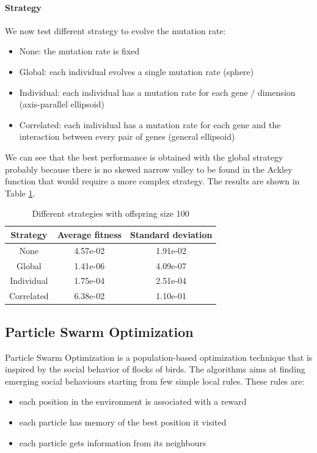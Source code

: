 \paragraph*{Strategy}
We now test different strategy to evolve the mutation rate:
\begin{itemize}
    \item None: the mutation rate is fixed
    \item Global: each individual evolves a single mutation rate (sphere)
    \item Individual: each individual has a mutation rate for each gene / dimension (axis-parallel ellipsoid)
    \item Correlated: each individual has a mutation rate for each gene and the interaction between every pair of genes (general ellipsoid)
\end{itemize}
We can see that the best performance is obtained with the global strategy probably because there is no skewed narrow valley to be found in the Ackley function that would require a more complex strategy. The results are shown in Table \ref{tab:es-strategy}.
\begin{table}[H]
    \centering
    \begin{tabular}{|c|c|c|}
        Strategy   & Average fitness & Standard deviation \\ \hline
        None       & 4.57e-02        & 1.91e-02           \\
        Global     & 1.41e-06        & 4.09e-07           \\
        Individual & 1.75e-04        & 2.51e-04           \\
        Correlated & 6.38e-02        & 1.10e-01           \\
    \end{tabular}
    \caption{Different strategies with offspring size 100}
    \label{tab:es-strategy}
\end{table}

\subsection{Particle Swarm Optimization}
Particle Swarm Optimization is a population-based optimization technique that is inspired by the social behavior of flocks of birds. The algorithms aims at finding emerging social behaviours starting from few simple local rules. These rules are:
\begin{itemize}
    \item each position in the environment is associated with a reward
    \item each particle has memory of the best position it visited
    \item each particle gets information from its neighbours
\end{itemize}

